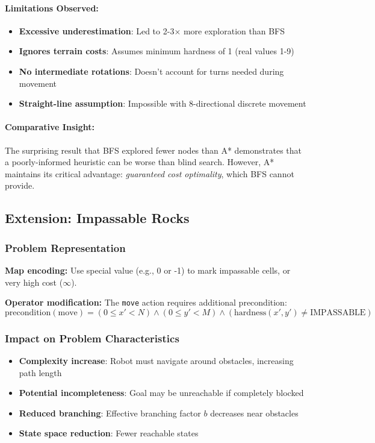 \documentclass[11pt,a4paper]{article}
\begin{document}
\paragraph{Limitations Observed:}
\begin{itemize}[leftmargin=1.5cm,itemsep=0.1em]
    \item \textbf{Excessive underestimation}: Led to 2-3× more exploration than BFS
    \item \textbf{Ignores terrain costs}: Assumes minimum hardness of 1 (real values 1-9)
    \item \textbf{No intermediate rotations}: Doesn't account for turns needed during movement
    \item \textbf{Straight-line assumption}: Impossible with 8-directional discrete movement
\end{itemize}

\paragraph{Comparative Insight:}
The surprising result that BFS explored fewer nodes than A* demonstrates that a poorly-informed heuristic can be worse than blind search. However, A* maintains its critical advantage: \textit{guaranteed cost optimality}, which BFS cannot provide.

\subsection{Extension: Impassable Rocks}

\subsubsection{Problem Representation}
\textbf{Map encoding:} Use special value (e.g., 0 or -1) to mark impassable cells, or very high cost ($\infty$).

\textbf{Operator modification:} The \texttt{move} action requires additional precondition:
$$\text{precondition}(\text{move}) = (0 \leq x' < N) \land (0 \leq y' < M) \land (\text{hardness}(x', y') \neq \text{IMPASSABLE})$$

\subsubsection{Impact on Problem Characteristics}
\begin{itemize}[leftmargin=1.5cm,itemsep=0.1em]
    \item \textbf{Complexity increase}: Robot must navigate around obstacles, increasing path length
    \item \textbf{Potential incompleteness}: Goal may be unreachable if completely blocked
    \item \textbf{Reduced branching}: Effective branching factor $b$ decreases near obstacles
    \item \textbf{State space reduction}: Fewer reachable states
\end{itemize}
\end{document}
